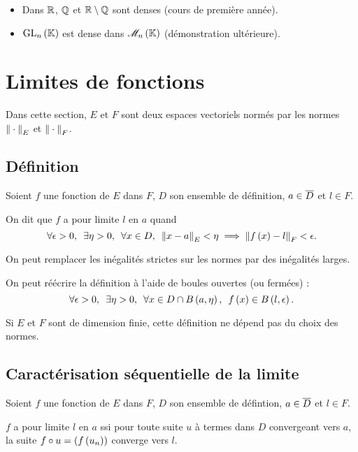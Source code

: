 \begin{ex}
\begin{itemize}
    \item Dans \(\mathbb{R}\), \(\mathbb{Q}\) et \(\mathbb{R}\setminus\mathbb{Q}\) sont denses (\cf cours de première année). \\
    \item \(\GL{n}\) est dense dans \(\M{n}\) (démonstration ultérieure).
\end{itemize}
\end{ex}

\section{Limites de fonctions}

Dans cette section, \(E\) et \(F\) sont deux espaces vectoriels normés par les normes \(\norme{}_E\) et \(\norme{}_F\).

\subsection{Définition}

\begin{defi}
Soient \(f\) une fonction de \(E\) dans \(F\), \(D\) son ensemble de définition, \(a\in\overline{D}\) et \(l\in F\).

On dit que \(f\) a pour limite \(l\) en \(a\) quand \[\quantifs{\forall\epsilon>0;\exists\eta>0;\forall x\in D}\norme{x-a}_E<\eta\imp\norme{f\paren{x}-l}_F<\epsilon.\]
\end{defi}

\begin{rem}
On peut remplacer les inégalités strictes sur les normes par des inégalités larges.

On peut réécrire la définition à l'aide de boules ouvertes (ou fermées) : \[\quantifs{\forall\epsilon>0;\exists\eta>0;\forall x\in D\inter\bouleo{a}{\eta}}f\paren{x}\in\bouleo{l}{\epsilon}.\]

Si \(E\) et \(F\) sont de dimension finie, cette définition ne dépend pas du choix des normes.
\end{rem}

\subsection{Caractérisation séquentielle de la limite}

\begin{theo}
Soient \(f\) une fonction de \(E\) dans \(F\), \(D\) son ensemble de défintion, \(a\in\overline{D}\) et \(l\in F\).

\(f\) a pour limite \(l\) en \(a\) ssi pour toute suite \(u\) à termes dans \(D\) convergeant vers \(a\), la suite \(f\circ u=\left(f\left(u_n\right)\right)\) converge vers \(l\).
\end{theo}

